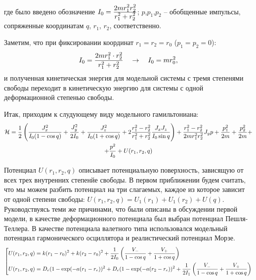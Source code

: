 \vlevo где было введено обозначение $I_0 = \frac{\displaystyle 2m r_1^2 r_2^2}{\displaystyle r_1^2 + r_2^2}$; $p$,$p_1$,$p_2$ -- обобщенные импульсы, сопряженные координатам $q$, $r_1$, $r_2$, соответственно.

Заметим, что при фиксировании координат $r_1 = r_2 = r_0$ ($p_1 = p_2 = 0$):
\vverh
\begin{gather}
I_0 = \frac{2m r_1^2 \cdot r_2^2}{r_1^2 + r_2^2} \quad \rightarrow \quad I_0 = m r_0^2, \notag 
\end{gather} 
и полученная кинетическая энергия для модельной системы с тремя степенями свободы переходит в кинетическую энергию для системы с одной деформационной степенью свободы.

Итак, приходим к слудующему виду модельного гамильтониана:
\begin{gather}
\mathcal{H} = \frac{1}{2} \left( \frac{J_x^2}{I_0 (1 - \cos q)} + \frac{J_y^2}{2 I_0} + \frac{J_z^2}{I_0 (1 + \cos q)} + 2 \frac{r_1^2 - r_2^2}{r_1^2 + r_2^2} \frac{J_x J_z}{I_0 \sin q} \right) + \frac{r_1^2 - r_2^2}{2m r_1^2 r_2^2} J_y p + \frac{p_1^2}{2m} + \frac{p_2^2}{2m} + \notag \\
+ \frac{p^2}{I_0} + U (r_1, r_2, q) \label{model_ham2}
\end{gather}

Потенциал $U(r_1, r_2, q)$ описывает потенциальную поверхность, зависящую от всех трех внутренних степенйе свободы. В первом приближении будем считать, что мы можем разбить потенциал на три слагаемых, каждое из которое зависит от одной степени свободы: $U(r_1, r_2, q) = U_1 (r_1) + U_1 (r_2) + U (q)$. 
Руководствуясь теми же причинами, что были описаны в обсуждении первой модели, в качестве деформационного потенциала был выбран потенциал Пешля-Теллера. В качестве потенциала валетного типа использовался модельный потенциал гармонического осциллятора и реалистический потенциал Морзе. 
\vverh
\begin{gather}
\left[
\begin{aligned}
U(r_1, r_2, q) &= k (r_1 - r_0)^2 + k (r_2 - r_0)^2 + \frac{1}{2 I_0} \left( \frac{\displaystyle V_{-}}{\displaystyle 1 - \cos q} + \frac{\displaystyle V_{+}}{\displaystyle 1 + \cos q} \right) \\
U(r_1, r_2, q) &= D_e (1 - \exp (- a (r_1 - r_e))^2 + D_e (1 - \exp (- a (r_2 - r_e))^2 + \frac{1}{2 I_1} \left( \frac{\displaystyle V_{-}}{\displaystyle 1 - \cos q} + \frac{\displaystyle V_{+}}{\displaystyle 1 + \cos q} \right) 
\end{aligned}
\right. \notag
\end{gather}


